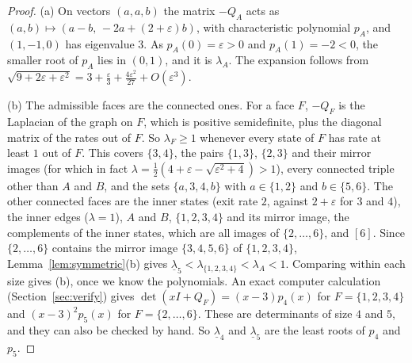 \begin{proof}
(a) On vectors $(a,a,b)$ the matrix $-Q_A$ acts as
$(a,b)\mapsto(a-b,\,-2a+(2+\varepsilon)b)$, with characteristic polynomial
$p_A$, and $(1,-1,0)$ has eigenvalue $3$. As $p_A(0)=\varepsilon>0$ and
$p_A(1)=-2<0$, the smaller root of $p_A$ lies in $(0,1)$, and it is $\lambda_A$.
The expansion follows from
$\sqrt{9+2\varepsilon+\varepsilon^2}=3+\frac\varepsilon3+\frac{4\varepsilon^2}{27}+O(\varepsilon^3)$.

(b) The admissible faces are the connected ones. For a face $F$, $-Q_F$ is the
Laplacian of the graph on $F$, which is positive semidefinite, plus the diagonal
matrix of the rates out of $F$. So $\lambda_F\ge1$ whenever every state of $F$
has rate at least $1$ out of $F$. This covers $\{3,4\}$, the pairs $\{1,3\}$,
$\{2,3\}$ and their mirror images (for which in fact
$\lambda=\frac12(4+\varepsilon-\sqrt{\varepsilon^2+4})>1$), every connected
triple other than $A$ and $B$, and the sets $\{a,3,4,b\}$ with $a\in\{1,2\}$
and $b\in\{5,6\}$. The other connected faces are the inner states (exit rate
$2$, against $2+\varepsilon$ for $3$ and $4$), the inner edges ($\lambda=1$),
$A$ and $B$, $\{1,2,3,4\}$ and its mirror image, the complements of the inner
states, which are all images of $\{2,\dots,6\}$, and $[6]$. Since
$\{2,\dots,6\}$ contains the mirror image $\{3,4,5,6\}$ of $\{1,2,3,4\}$,
Lemma~\ref{lem:symmetric}(b) gives
$\underline\lambda_5<\lambda_{\{1,2,3,4\}}<\lambda_A<1$. Comparing within each
size gives (b), once we know the polynomials. An exact computer calculation
(Section~\ref{sec:verify}) gives $\det(xI+Q_F)=(x-3)p_4(x)$ for
$F=\{1,2,3,4\}$ and $(x-3)^2p_5(x)$ for $F=\{2,\dots,6\}$. These are
determinants of size $4$ and $5$, and they can also be checked by hand. So
$\underline\lambda_4$ and $\underline\lambda_5$ are the least roots of $p_4$
and $p_5$.


\end{proof}
